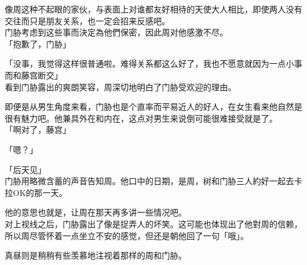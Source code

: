 像周这种不起眼的家伙，与表面上对谁都友好相待的天使大人相比，即使两人没有交往而只是朋友关系，也一定会招来反感吧。\\

门胁考虑到这些事而決定為他們保密，因此周对他感激不尽。\\

「抱歉了，门胁」

「没事，我觉得这样很普通啦。难得关系都这么好了，我也不愿意就因为一点小事而和藤宫断交」\\

看到门胁露出的爽朗笑容，周深切地明白了门胁受欢迎的理由。

即便是从男生角度来看，门胁也是个直率而平易近人的好人，在女生看来他自然是很有魅力吧。他兼具外在和内在，这点对男生来说倒可能很难接受就是了。\\

「啊对了，藤宫」

「嗯？」

「后天见」\\

门胁用略微含蓄的声音告知周。他口中的日期，是周，树和门胁三人約好一起去卡拉OK的那一天。

他的意思也就是，让周在那天再多讲一些情况吧。\\

对上视线之后，门胁露出了像是捉弄人的坏笑。这可能也体现出了他對周的信赖，所以周尽管怀着一点坐立不安的感觉，但还是朝他回了一句「哦」。

真昼则是稍稍有些羡慕地注视着那样的周和门胁。
